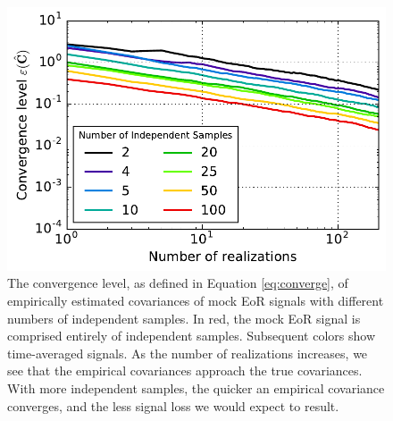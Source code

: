 \documentclass[preprint2,numberedappendix,tighten]{aastex6}  %
\begin{document}

\begin{figure}
	\centering
	\includegraphics[width=\columnwidth]{plots/toy_sigloss16.pdf}
	\caption{The convergence level, as defined in Equation \eqref{eq:converge}, of empirically estimated covariances of mock EoR signals with different numbers of independent samples. In red, the mock EoR signal is comprised entirely of independent samples. Subsequent colors show time-averaged signals. As the number of realizations increases, we see that the empirical covariances approach the true covariances. With more independent samples, the quicker an empirical covariance converges, and the less signal loss we would expect to result.}
	\label{fig:toy_sigloss16}
\end{figure}
\end{document}

